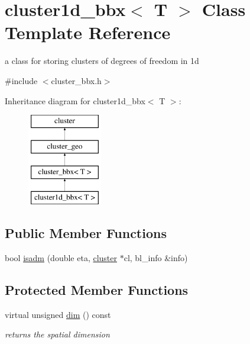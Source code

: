 \hypertarget{classcluster1d__bbx}{
\section{cluster1d\-\_\-bbx$<$ \-T $>$ \-Class \-Template \-Reference}
\label{classcluster1d__bbx}
}


a class for storing clusters of degrees of freedom in 1d  




{\ttfamily \#include $<$cluster\-\_\-bbx.\-h$>$}

\-Inheritance diagram for cluster1d\-\_\-bbx$<$ \-T $>$\-:\begin{figure}[H]
\begin{center}
\leavevmode
\includegraphics[height=4.000000cm]{classcluster1d__bbx}
\end{center}
\end{figure}
\subsection*{\-Public \-Member \-Functions}
\begin{DoxyCompactItemize}
\item 
bool \hyperlink{classcluster1d__bbx_afbdd020333c05115e04969bef28db2cf}{isadm} (double eta, \hyperlink{classcluster}{cluster} $\ast$cl, bl\-\_\-info \&info)
\end{DoxyCompactItemize}
\subsection*{\-Protected \-Member \-Functions}
\begin{DoxyCompactItemize}
\item 
\hypertarget{classcluster1d__bbx_a897f33d1e275ac795bda3ed5447bd530}{
virtual unsigned \hyperlink{classcluster1d__bbx_a897f33d1e275ac795bda3ed5447bd530}{dim} () const }
\label{classcluster1d__bbx_a897f33d1e275ac795bda3ed5447bd530}

\begin{DoxyCompactList}\small\item\em returns the spatial dimension \end{DoxyCompactList}\end{DoxyCompactItemize}


